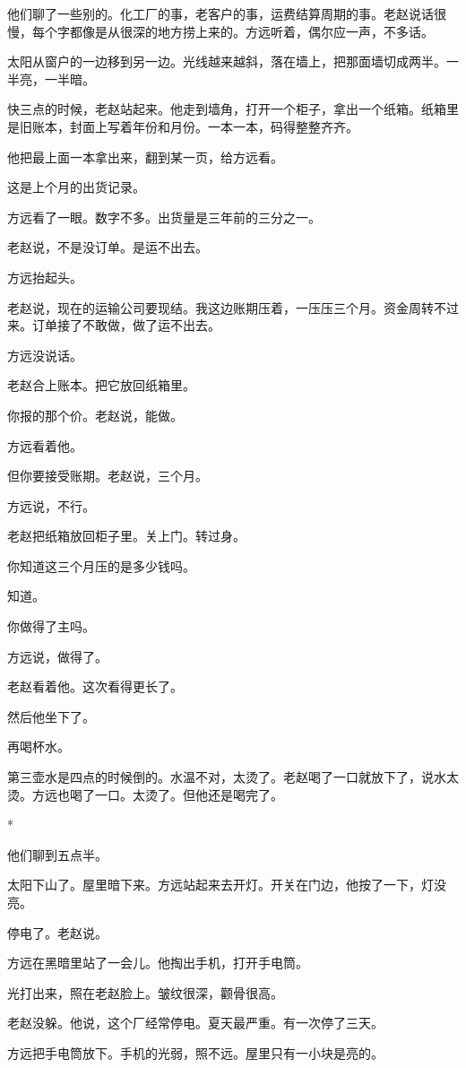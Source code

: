 \documentclass[UTF8,a5paper,11pt,openany]{ctexbook}
\newcommand{\scene}{\vspace{1em}\begin{center}*\quad*\quad*\end{center}\vspace{0.5em}}
\begin{document}
他们聊了一些别的。化工厂的事，老客户的事，运费结算周期的事。老赵说话很慢，每个字都像是从很深的地方捞上来的。方远听着，偶尔应一声，不多话。

太阳从窗户的一边移到另一边。光线越来越斜，落在墙上，把那面墙切成两半。一半亮，一半暗。

快三点的时候，老赵站起来。他走到墙角，打开一个柜子，拿出一个纸箱。纸箱里是旧账本，封面上写着年份和月份。一本一本，码得整整齐齐。

他把最上面一本拿出来，翻到某一页，给方远看。

这是上个月的出货记录。

方远看了一眼。数字不多。出货量是三年前的三分之一。

老赵说，不是没订单。是运不出去。

方远抬起头。

老赵说，现在的运输公司要现结。我这边账期压着，一压压三个月。资金周转不过来。订单接了不敢做，做了运不出去。

方远没说话。

老赵合上账本。把它放回纸箱里。

你报的那个价。老赵说，能做。

方远看着他。

但你要接受账期。老赵说，三个月。

方远说，不行。

老赵把纸箱放回柜子里。关上门。转过身。

你知道这三个月压的是多少钱吗。

知道。

你做得了主吗。

方远说，做得了。

老赵看着他。这次看得更长了。

然后他坐下了。

再喝杯水。

第三壶水是四点的时候倒的。水温不对，太烫了。老赵喝了一口就放下了，说水太烫。方远也喝了一口。太烫了。但他还是喝完了。


\scene

他们聊到五点半。

太阳下山了。屋里暗下来。方远站起来去开灯。开关在门边，他按了一下，灯没亮。

停电了。老赵说。

方远在黑暗里站了一会儿。他掏出手机，打开手电筒。

光打出来，照在老赵脸上。皱纹很深，颧骨很高。

老赵没躲。他说，这个厂经常停电。夏天最严重。有一次停了三天。

方远把手电筒放下。手机的光弱，照不远。屋里只有一小块是亮的。
\end{document}
